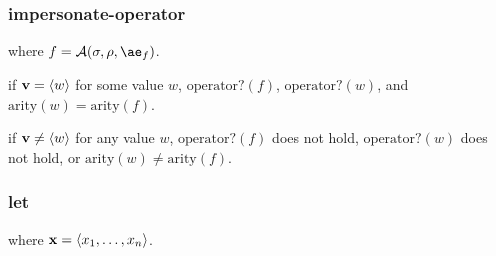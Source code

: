 \documentclass{sigplanconf}
\begin{document}





\subsubsection{impersonate-operator}


\noindent
{}

\noindent
where $f=\A{\sigma}{\rho}{\ae_f}$.

\noindent
{}

\noindent
if $\mathbf{v}=\langle w\rangle$ for some value $w$, $\mathrm{operator?}(f)$, $\mathrm{operator?}(w)$, and $\mathrm{arity}(w)=\mathrm{arity}(f)$.

\noindent
{}

\noindent
if $\mathbf{v}\ne\langle w\rangle$ for any value $w$, $\mathrm{operator?}(f)$ does not hold, $\mathrm{operator?}(w)$ does not hold, or $\mathrm{arity}(w)\ne\mathrm{arity}(f)$.

\subsubsection{let}

\noindent
{}

\noindent
where $\mathbf{x}=\langle x_1,\dots,x_n\rangle$.
\end{document}
